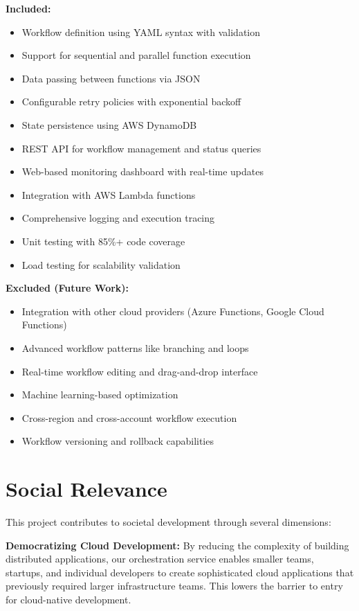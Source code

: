 \documentclass{fisatprojectfinal}
\begin{document}
\textbf{Included:}
\begin{itemize}
    \item Workflow definition using YAML syntax with validation
    \item Support for sequential and parallel function execution
    \item Data passing between functions via JSON
    \item Configurable retry policies with exponential backoff
    \item State persistence using AWS DynamoDB
    \item REST API for workflow management and status queries
    \item Web-based monitoring dashboard with real-time updates
    \item Integration with AWS Lambda functions
    \item Comprehensive logging and execution tracing
    \item Unit testing with 85\%+ code coverage
    \item Load testing for scalability validation
\end{itemize}

\textbf{Excluded (Future Work):}
\begin{itemize}
    \item Integration with other cloud providers (Azure Functions, Google Cloud Functions)
    \item Advanced workflow patterns like branching and loops
    \item Real-time workflow editing and drag-and-drop interface
    \item Machine learning-based optimization
    \item Cross-region and cross-account workflow execution
    \item Workflow versioning and rollback capabilities
\end{itemize}

\section{Social Relevance}
This project contributes to societal development through several dimensions:

\textbf{Democratizing Cloud Development:} By reducing the complexity of building distributed applications, our orchestration service enables smaller teams, startups, and individual developers to create sophisticated cloud applications that previously required larger infrastructure teams. This lowers the barrier to entry for cloud-native development.
\end{document}

